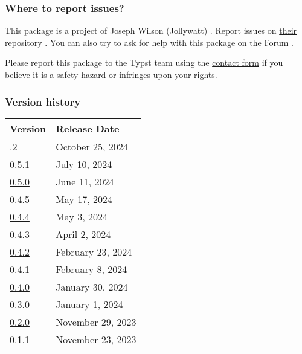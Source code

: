 \subsubsection{Where to report issues?}\label{where-to-report-issues}

This package is a project of Joseph Wilson (Jollywatt) . Report issues
on \href{https://github.com/Jollywatt/typst-fletcher}{their repository}
. You can also try to ask for help with this package on the
\href{https://forum.typst.app}{Forum} .

Please report this package to the Typst team using the
\href{https://typst.app/contact}{contact form} if you believe it is a
safety hazard or infringes upon your rights.

\label{versions}
\subsubsection{Version history}\label{version-history}

\begin{longtable}[]{@{}ll@{}}
\toprule\noalign{}
Version & Release Date \\
\midrule\noalign{}
\endhead
\bottomrule\noalign{}
\endlastfoot
0.5.2 & October 25, 2024 \\
\href{https://typst.app/universe/package/fletcher/0.5.1/}{0.5.1} & July
10, 2024 \\
\href{https://typst.app/universe/package/fletcher/0.5.0/}{0.5.0} & June
11, 2024 \\
\href{https://typst.app/universe/package/fletcher/0.4.5/}{0.4.5} & May
17, 2024 \\
\href{https://typst.app/universe/package/fletcher/0.4.4/}{0.4.4} & May
3, 2024 \\
\href{https://typst.app/universe/package/fletcher/0.4.3/}{0.4.3} & April
2, 2024 \\
\href{https://typst.app/universe/package/fletcher/0.4.2/}{0.4.2} &
February 23, 2024 \\
\href{https://typst.app/universe/package/fletcher/0.4.1/}{0.4.1} &
February 8, 2024 \\
\href{https://typst.app/universe/package/fletcher/0.4.0/}{0.4.0} &
January 30, 2024 \\
\href{https://typst.app/universe/package/fletcher/0.3.0/}{0.3.0} &
January 1, 2024 \\
\href{https://typst.app/universe/package/fletcher/0.2.0/}{0.2.0} &
November 29, 2023 \\
\href{https://typst.app/universe/package/fletcher/0.1.1/}{0.1.1} &
November 23, 2023 \\
\end{longtable}


